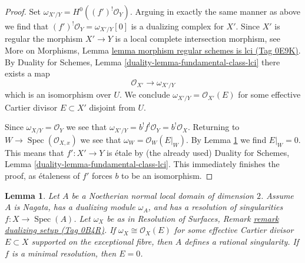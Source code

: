 \documentclass{amsart}
\theoremstyle{plain}
\newtheorem{lemma}[subsection]{Lemma}
\theoremstyle{definition}
\theoremstyle{remark}
\numberwithin{equation}{subsection}
\def\Spec{\mathop{\mathrm{Spec}}}
\begin{document}
\begin{proof}
\medskip\noindent
Set $\omega_{X'/Y} = H^0((f')^!\mathcal{O}_Y)$. Arguing in exactly the
same manner as above we find that $(f')^!\mathcal{O}_Y = \omega_{X'/Y}[0]$
is a dualizing complex for $X'$. Since $X'$ is regular
the morphism $X' \to Y$ is a local complete intersection morphism, see
More on Morphisms, Lemma
\href{https://stacks.math.columbia.edu/tag/0E9K}{lemma morphism regular schemes is lci (Tag 0E9K)}.
By Duality for Schemes, Lemma \ref{duality-lemma-fundamental-class-lci}
there exists a map
$$
\mathcal{O}_{X'} \longrightarrow \omega_{X'/Y}
$$
which is an isomorphism over $U$. We conclude
$\omega_{X'/Y} = \mathcal{O}_{X'}(E)$ for some effective
Cartier divisor $E \subset X'$ disjoint from $U$.

\medskip\noindent
Since $\omega_{X/Y} = \mathcal{O}_Y$ we see that
$\omega_{X'/Y} = b^! f^!\mathcal{O}_Y = b^!\mathcal{O}_X$.
Returning to $W \to \Spec(\mathcal{O}_{X, x})$
we see that $\omega_W = \mathcal{O}_W(E|_W)$.
By Lemma \ref{lemma-characterize-rational-singularity}
we find $E|_W = 0$.
This means that $f' : X' \to Y$ is \'etale by (the already used)
Duality for Schemes, Lemma \ref{duality-lemma-fundamental-class-lci}.
This immediately finishes the proof, as \'etaleness
of $f'$ forces $b$ to be an isomorphism.
\end{proof}


\begin{lemma}
\label{lemma-characterize-rational-singularity}
Let $A$ be a Noetherian normal local domain of dimension $2$.
Assume $A$ is Nagata, has a dualizing module $\omega_A$, and has a
resolution of singularities $f : X \to \Spec(A)$.
Let $\omega_X$ be as in Resolution of Surfaces,
Remark \href{https://stacks.math.columbia.edu/tag/0B4R}{remark dualizing setup (Tag 0B4R)}.
If $\omega_X \cong \mathcal{O}_X(E)$ for some effective
Cartier divisor $E \subset X$ supported on the exceptional
fibre, then $A$ defines a rational singularity.
If $f$ is a minimal resolution, then $E = 0$.
\end{lemma}
\end{document}
